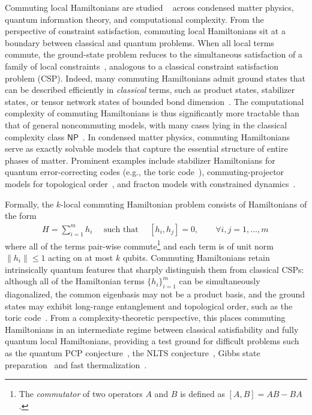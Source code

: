 \documentclass[11pt]{article}
\theoremstyle{plain}
\begin{document}
Commuting local Hamiltonians are studied ~\cite{bravyi2004commutativeversionklocalhamiltonian,aharonov2011complexity,schuch2011complexitycommutinghamiltonianssquare,AKV,irani2023commutinglocalhamiltonianproblem,bostanci2025commutinglocalhamiltonians2d} across condensed matter physics, quantum information theory, and computational complexity. From the perspective of constraint 
satisfaction, commuting local Hamiltonians sit at a boundary between 
classical and quantum problems.  When all local terms commute, 
the ground-state problem reduces to the simultaneous satisfaction of a 
family of local constraints~\cite{bravyi2004commutativeversionklocalhamiltonian}, analogous to a classical constraint 
satisfaction problem (CSP).  Indeed, many commuting Hamiltonians admit 
ground states that can be described efficiently in \emph{classical} terms, 
such as product states, stabilizer states, or tensor network states of 
bounded bond dimension~\cite{Gharibian_2015}. The computational complexity 
of commuting Hamiltonians is thus significantly more tractable than that of 
general noncommuting models, with many cases lying in the classical complexity class $\mathsf{NP}$~\cite{bravyi2004commutativeversionklocalhamiltonian,irani2023commutinglocalhamiltonianproblem,bostanci2025commutinglocalhamiltonians2d}.
In condensed matter physics, commuting Hamiltonians serve as exactly 
solvable models that capture the essential structure of entire 
phases of matter.  Prominent examples include stabilizer Hamiltonians 
for quantum error-correcting codes (e.g., the toric code~\cite{Kitaev_2003}), commuting-projector models for 
topological order~\cite{Levin_2005}, and fracton models with constrained dynamics~\cite{Vijay_2016}. 

\noindent Formally, the $k$-local commuting Hamiltonian problem consists of Hamiltonians of the form
\begin{align}
H=\sum_{i=1}^m h_i \quad \text{ such that } \quad [h_i,h_j]=0, \quad\quad  \forall i,j=1,\dots,m \,
\end{align}
where all of the terms pair-wise commute\footnote{The \emph{commutator} of two operators $A$ and $B$ is defined as $[A,B] = AB - BA$.} and each term is of unit norm $\|h_i\|\leq 1$ acting on at most $k$ qubits.
Commuting Hamiltonians retain intrinsically quantum features that sharply distinguish them from classical CSPs: although all of the Hamiltonian terms $\{h_i\}_{i=1}^m$ can be simultaneously diagonalized, the common eigenbasis may not be a product basis, and the ground states may exhibit long-range entanglement and topological order, such as the toric code~\cite{Kitaev_2003}. From a complexity-theoretic perspective, this places commuting Hamiltonians in an intermediate regime between classical satisfiability and fully quantum local Hamiltonians, providing a test ground for
difficult problems such as the quantum PCP conjecture~\cite{aharonov2011complexity,Hastings2012}, the NLTS conjecture~\cite{Anshu_2023}, Gibbs state preparation~\cite{kastoryano2016quantumgibbssamplerscommuting} and fast thermalization~\cite{chen2023fastthermalizationeigenstatethermalization}.
\end{document}
